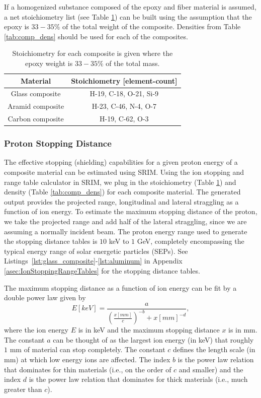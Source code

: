 \documentclass{hitec}
\begin{document}
If a homogenized substance composed of the epoxy and fiber material is assumed, a net stoichiometry list (see Table \ref{tab:stoichiometry-net}) can be built using the assumption that the epoxy is $33-35\%$ of the total weight of the composite. Densities from Table \ref{tab:comp_dens} should be used for each of the composites.

\begin{table}[h]\centering
	\caption{Stoichiometry for each composite is given where the epoxy weight is $33-35\%$ of the total mass.}\label{tab:stoichiometry-net}
	\begin{tabular}{|c | c |}\hline
		Material & Stoichiometry [element-count] \\\hline
		Glass composite & H-19, C-18, O-21, Si-9 \\\hline
		Aramid composite & H-23, C-46, N-4, O-7  \\\hline
		Carbon composite & H-19, C-62, O-3  \\\hline	
	\end{tabular}
\end{table}

\subsubsection{Proton Stopping Distance}
\label{sssec:ProtonStoppingDistance}

The effective stopping (shielding) capabilities for a given proton energy of a composite material can be estimated using SRIM. Using the ion stopping and range table calculator in SRIM, we plug in the stoichiometry (Table \ref{tab:stoichiometry-net}) and density (Table \ref{tab:comp_dens}) for each composite material. The generated output provides the projected range, longitudinal and lateral straggling as a function of ion energy. To estimate the maximum stopping distance of the proton, we take the projected range and add half of the lateral straggling, since we are assuming a normally incident beam. The proton energy range used to generate the stopping distance tables is $10$ keV to $1$ GeV, completely encompassing the typical energy range of solar energetic particles (SEPs). See Listings~\ref{lst:glass_composite}-\ref{lst:aluminum} in Appendix \ref{asec:IonStoppingRangeTables} for the stopping distance tables.

The maximum stopping distance as a function of ion energy can be fit by a double power law given by
\begin{equation}\label{eq:energy_vs_stopping_distance}
E[keV] = \frac{a}{\left(\frac{x[mm]}{c}\right)^{-b} + x[mm]^{-d}},
\end{equation}
where the ion energy $E$ is in keV and the maximum stopping distance $x$ is in mm. The constant $a$ can be thought of as the largest ion energy (in keV) that roughly $1$ mm of material can stop completely. The constant $c$ defines the length scale (in mm) at which low energy ions are affected. The index $b$ is the power law relation that dominates for thin materials (i.e., on the order of $c$ and smaller) and the index $d$ is the power law relation that dominates for thick materials (i.e., much greater than $c$).
\end{document}
